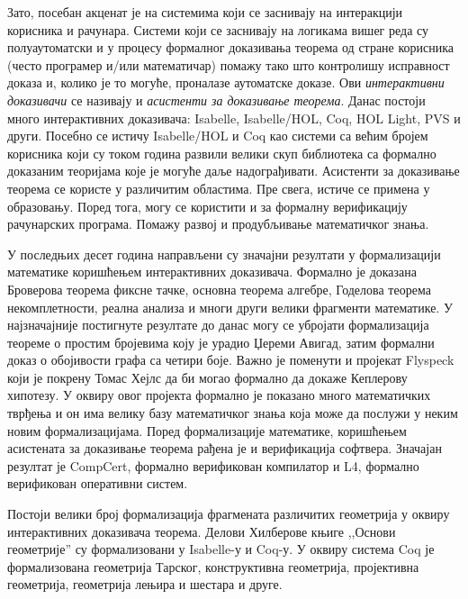 \documentclass[11pt]{article}
\newcommand{\lat}{}
\begin{document}
Зато, посебан акценат је на системима који се заснивају на интеракцији
корисника и рачунара. Системи који се заснивају на логикама вишег реда
су полуаутоматски и у процесу формалног доказивања теорема од стране
корисника (често програмер и/или математичар) помажу тако што
контролишу исправност доказа и, колико је то могуће, проналазе
аутоматске доказе. Ови {\em интерактивни доказивачи} се називају и
{\em асистенти за доказивање теорема}. Данас постоји много
интерактивних доказивача: {\lat Isabelle, Isabelle/HOL, Coq, HOL
  Light, PVS} и други. Посебно се истичу {\lat Isabelle/HOL} и {\lat
  Coq} као системи са већим бројем корисника који су током година
развили велики скуп библиотека са формално доказаним теоријама које је
могуће даље надограђивати. Асистенти за доказивање теорема се користе
у различитим областима. Пре свега, истиче се примена у
образовању. Поред тога, могу се користити и за формалну верификацију
рачунарских програма. Помажу развој и продубљивање математичког знања.

У последњих десет година направљени су значајни резултати у формализацији
математике ко\-ри\-шће\-њем интерактивних доказивача. Формално је
доказана Броверова теорема фиксне тачке, основна теорема алгебре,
Годелова теорема некомплетности, реална анализа и многи други велики
фрагменти математике. У најзначајније постигнуте резултате до данас
могу се убројати формализација теореме о простим бројевима коју је
урадио Џереми Авигад, затим формални доказ о обојивости графа са
четири боје. Важно је поменути и пројекат Flyspeck који је покрену
Томас Хејлс да би могао формално да докаже Кеплерову хипотезу. У
оквиру овог пројекта формално је показано много математичких тврђења и
он има велику базу математичког знања која може да послужи у неким
новим формализацијама. Поред фор\-ма\-ли\-за\-ци\-је математике,
коришћењем асистената за доказивање теорема рађена је и верификација
софтвера. Значајан резултат је CompCert, формално верификован
компилатор и L4, формално верификован оперативни систем.

Постоји велики број формализација фрагмената различитих геометрија у
оквиру инте\-ра\-кти\-вних доказивача теорема. Делови Хилберове књиге
,,Основи геометрије'' су формализовани у {\lat Isabelle}-у и {\lat
  Coq}-у. У оквиру система {\lat Coq} је формализована геометрија
Тарског, конструктивна ге\-о\-мет\-ри\-ја, пројективна геометрија,
геометрија лењира и шестара и друге.
\end{document}
